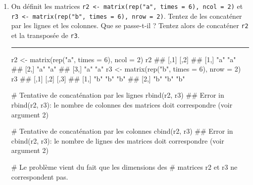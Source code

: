 \documentclass[12pt,twosided, notitlepage]{book}
\newenvironment{Shaded}{}{}
\newcommand{\KeywordTok}[1]{\textcolor[rgb]{0.00,0.00,1.00}{{#1}}}
\newcommand{\DataTypeTok}[1]{{#1}}
\newcommand{\DecValTok}[1]{{#1}}
\newcommand{\StringTok}[1]{\textcolor[rgb]{0.00,0.50,0.50}{{#1}}}
\newcommand{\CommentTok}[1]{\textcolor[rgb]{0.00,0.50,0.00}{{#1}}}
\newcommand{\NormalTok}[1]{{#1}}
\newif \ifsol
\renewenvironment{Shaded}{\begin{snugshade}}{\end{snugshade}}
\begin{document}
\begin{enumerate}
\begin{enumerate}
    \begin{center} \rule{0.5\linewidth}{\linethickness}\end{center}

    \bigskip  \fi 
  \end{enumerate}
\item
  On définit les matrices
  \texttt{r2\ \textless{}-\ matrix(rep("a",\ times\ =\ 6),\ ncol\ =\ 2)}
  et
  \texttt{r3\ \textless{}-\ matrix(rep("b",\ times\ =\ 6),\ nrow\ =\ 2)}.
  Tentez de les concaténer par les lignes et les
  colonnes. Que se
  passe-t-il ? Tentez alors de concaténer \texttt{r2} et la transposée
  de \texttt{r3}.

  \ifsol 

  \begin{center} \rule{0.5\linewidth}{\linethickness}\end{center}

\begin{Shaded}
\begin{Highlighting}[]
\NormalTok{r2 <-}\StringTok{ }\KeywordTok{matrix}\NormalTok{(}\KeywordTok{rep}\NormalTok{(}\StringTok{"a"}\NormalTok{, }\DataTypeTok{times =} \DecValTok{6}\NormalTok{), }\DataTypeTok{ncol =} \DecValTok{2}\NormalTok{)}
\NormalTok{r2}
  \NormalTok{##      [,1] [,2]}
  \NormalTok{## [1,] "a"  "a" }
  \NormalTok{## [2,] "a"  "a" }
  \NormalTok{## [3,] "a"  "a"}
\NormalTok{r3 <-}\StringTok{ }\KeywordTok{matrix}\NormalTok{(}\KeywordTok{rep}\NormalTok{(}\StringTok{"b"}\NormalTok{, }\DataTypeTok{times =} \DecValTok{6}\NormalTok{), }\DataTypeTok{nrow =} \DecValTok{2}\NormalTok{)}
\NormalTok{r3}
  \NormalTok{##      [,1] [,2] [,3]}
  \NormalTok{## [1,] "b"  "b"  "b" }
  \NormalTok{## [2,] "b"  "b"  "b"}

\CommentTok{# Tentative de concaténation par les lignes}
\KeywordTok{rbind}\NormalTok{(r2, r3)}
  \NormalTok{## Error in rbind(r2, r3): le nombre de colonnes des matrices doit correspondre (voir argument 2)}

\CommentTok{# Tentative de concaténation par les colonnes}
\KeywordTok{cbind}\NormalTok{(r2, r3)}
  \NormalTok{## Error in cbind(r2, r3): le nombre de lignes des matrices doit correspondre (voir argument 2)}

\CommentTok{# Le problème vient du fait que les dimensions des }
\CommentTok{# matrices r2 et r3 ne correspondent pas. }


\end{Highlighting}
\end{Shaded}
\end{enumerate}
\end{document}
